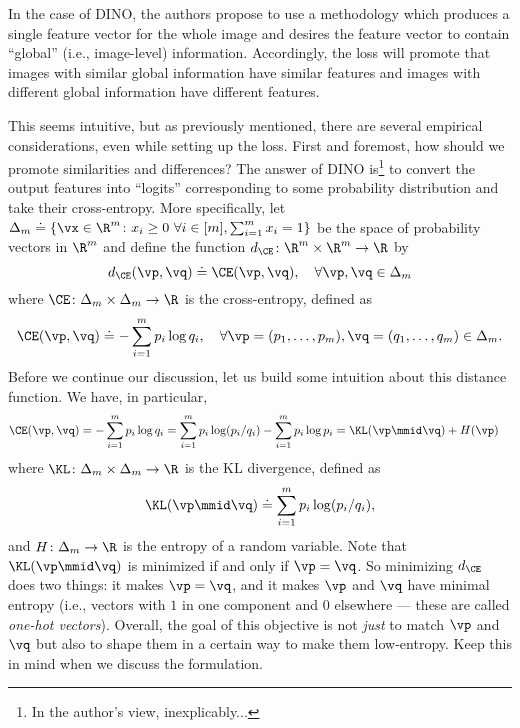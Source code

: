 \documentclass[../../book-main.tex]{subfiles}
\begin{document}
In the case of DINO, the authors propose to use a methodology which produces a single feature vector for the whole image and desires the feature vector to contain ``global'' (i.e., image-level) information. Accordingly, the loss will promote that images with similar global information have similar features and images with different global information have different features.

This seems intuitive, but as previously mentioned, there are several empirical considerations, even while setting up the loss. First and foremost, how should we promote similarities and differences? The answer of DINO \citep{caron2021emerging} is\footnote{In the author's view, inexplicably...} to convert the output features into ``logits'' corresponding to some probability distribution and take their cross-entropy. More specifically, let \(\Delta_{m} \doteq \{\vx \in \R^{m} \colon x_{i} \geq 0\ \forall i \in [m], \sum_{i = 1}^{m}x_{i} = 1\}\) be the space of probability vectors in \(\R^{m}\) and define the function \(d_{\CE} \colon \R^{m} \times \R^{m} \to \R\) by
 \begin{equation}\label{eq:cross_entropy_difference}
    d_{\CE}(\vp, \vq) \doteq \CE(\vp, \vq), \quad \forall \vp, \vq \in \Delta_{m}
 \end{equation}
 where \(\CE \colon \Delta_{m} \times \Delta_{m} \to \R\) is the cross-entropy, defined as 
 \begin{equation}\label{eq:expts_def_ce}
    \CE(\vp, \vq) \doteq -\sum_{i = 1}^{m}p_{i}\log q_{i}, \quad \forall \vp = (p_{1}, \dots, p_{m}), \vq = (q_{1}, \dots, q_{m}) \in \Delta_{m}.
 \end{equation}
 Before we continue our discussion, let us build some intuition about this distance function. We have, in particular,
 \begin{align}
    \CE(\vp, \vq)
    &= -\sum_{i = 1}^{m}p_{i}\log q_{i} = \sum_{i = 1}^{m}p_{i}\log(p_{i}/q_{i})
     - \sum_{i = 1}^{m}p_{i}\log p_{i} = \KL(\vp\mmid \vq) + H(\vp)
 \end{align}
 where \(\KL \colon \Delta_{m} \times \Delta_{m} \to \R\) is the KL divergence, defined as 
 \begin{equation}
    \KL(\vp\mmid \vq) \doteq \sum_{i = 1}^{m}p_{i}\log(p_{i}/q_{i}),
 \end{equation}
 and \(H \colon \Delta_{m} \to \R\) is the entropy of a random variable. Note
 that \(\KL(\vp\mmid \vq)\) is minimized if and only if \(\vp = \vq\). So minimizing \(d_{\CE}\) does two things: it makes \(\vp = \vq\), and it makes \(\vp\) and \(\vq\) have minimal entropy (i.e., vectors with \(1\) in one component and \(0\) elsewhere --- these are called \textit{one-hot vectors}). Overall, the goal of this objective is not \textit{just} to match \(\vp\) and \(\vq\) but also to shape them in a certain way to make them low-entropy. Keep this in mind when we discuss the formulation.
\end{document}
